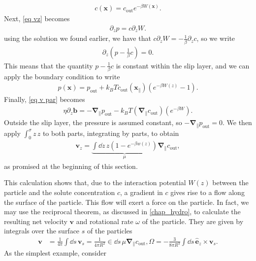 %
\begin{align}
    c(\bm x) = c_\mathrm{out} e^{-\beta W(\bm x)}.
\end{align}
%
Next, \autoref{eq vz} becomes
%
\begin{align}
    \partial_z p =  c \partial_z W.
\end{align}
%
using the solution we found earlier, we have that $c \partial_z W = - \frac{1}{\beta}\partial_z c$, so we write
%
\begin{align}
    \partial_z\left(p - \frac{1}{\beta} c\right) = 0.
\end{align}
%
This means that the quantity $p - \frac{1}{\beta} c$ is constant within the slip layer, and we can apply the boundary condition to write
%
\begin{align}
    p(\bm x) 
    = p_\mathrm{out} 
    + k_B T c_\mathrm{out}(\bm x_\parallel) \left( e^{- \beta W(z)} - 1 \right).
\end{align}
%
Finally, \autoref{eq v par} becomes
%
\begin{align}
    \eta \partial_z \bm b = -\bm \nabla_\parallel p_\mathrm{out}
    - k_B T \left(\bm \nabla_\parallel c_\mathrm{out} \right)
    \left(e^{- \beta W}\right).
\end{align}
%
Outside the slip layer, the pressure is assumed constant, so $-\bm \nabla_\parallel p_\mathrm{out} = 0$.
We then apply $\int_{0}^\sigma z \, z$ to both parts, integrating by parts, to obtain
%
\begin{align}
    \bm v_z = \underbrace{\int \dd z \, z \left(1 - e^{-\beta w(z)}\right)}_{\mu}
    \bm \nabla_\parallel c_\mathrm{out},
\end{align}
%
as promised at the beginning of this section.

This calculation shows that, due to the interaction potential $W(z)$ between the particle and the solute concentration $c$, a gradient in $c$ gives rise to a flow along the surface of the particle.
This flow will exert a force on the particle.
In fact, we may use the reciprocal theorem, as discussed in \autoref{chap_hydro}, to calculate the resulting net velocity $\bm v$ and rotational rate $\omega$ of the particle.
They are given by integrals over the surface $s$ of the particles
%
\begin{align}
    \bm v & = 
    \frac{1}{4 \pi} \int \dd s \, \bm v_s
    = \frac{1}{4 \pi R^2} \in \dd s \,  \mu \bm \nabla_\parallel c_\mathrm{out}, 
    \Omega = - \frac{3}{8 \pi R^3} \int \dd s \, \hat {\bm e}_z \times \bm v_s.
\end{align}
%
As the simplest example, consider

